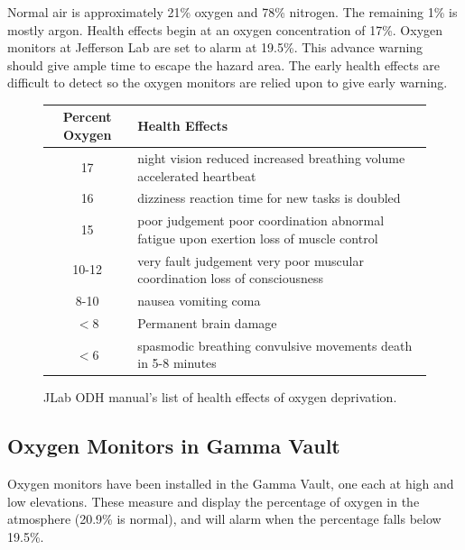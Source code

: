 \begin{displayquote}
Normal air is approximately 21\% oxygen and 78\% nitrogen. The remaining 1\% is mostly argon. Health effects begin at an oxygen concentration of 17\%. Oxygen monitors at Jefferson Lab are set to alarm at 19.5\%. This advance warning should give ample time to escape the hazard area.  The early health effects are difficult to detect so the oxygen monitors are relied upon to give early warning.
\end{displayquote}

\begin{figure}
\centering
\begin{tabular}{|c|p{6cm}|}
 \hline
Percent Oxygen & Health Effects \\
\hline
17 & night vision reduced \newline increased breathing volume \newline accelerated heartbeat \\
\hline
16 & dizziness \newline reaction time for new tasks is doubled\\
\hline
15 & poor judgement \newline poor coordination \newline abnormal fatigue upon exertion \newline loss of muscle control\\
\hline
10-12 & very fault judgement \newline very poor muscular coordination \newline loss of consciousness\\
\hline
8-10& nausea \newline vomiting \newline coma\\
\hline
$<$8 & Permanent brain damage \\
\hline
$<$6 & spasmodic breathing \newline convulsive movements \newline death in 5-8 minutes \\
\hline
\end{tabular} 
\caption{JLab ODH manual's list of health effects of oxygen deprivation.}
\label{fig:jlabodh}
\end{figure}



\subsection{Oxygen Monitors in Gamma Vault\cite{wallace-odh}}
Oxygen monitors have been installed in the Gamma Vault, one each at high and low elevations.  These measure and display the percentage of oxygen in the atmosphere (20.9\% is normal), and will alarm when the percentage falls below 19.5\%.


